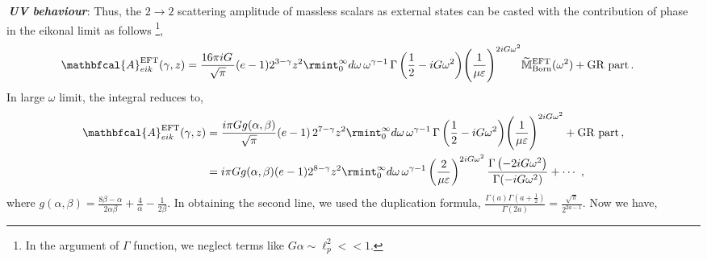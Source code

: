 \noindent
{\textit{\textbf{\,{UV behaviour}}}}:
Thus, the $2\rightarrow2$ scattering amplitude of massless scalars as external states can be casted with the contribution of phase in the eikonal limit as follows \footnote{In the argument of $\Gamma$ function, we neglect terms like $G\alpha\sim \ell_p^2<<1$.}, 
\begin{align}
    \begin{split}\label{3.32a}
    \mathbfcal{A}^{\textrm{EFT}}_{eik}(\gamma,z)&=\frac{16\pi i G \,}{\sqrt{\pi}}(e-1)2^{3-\gamma}z^2\rmint_0^\infty d\omega \,\omega^{\gamma-1}\,{\Gamma\left(\frac{1}{2}-iG \omega^2\right)}\Bigg(\frac{1}{\mu \varepsilon}\Bigg)^{2iG\omega^2}\widetilde{\mathbb{M}}^{\textrm{EFT}}_{\textrm{Born}}(\omega^2)+\textrm{GR part}\,.
    \end{split}
\end{align}
In large $\omega$ limit, the integral reduces to,
\begin{align}
\begin{split}\label{3.27k}
\mathbfcal{A}^{\textrm{EFT}}_{eik}(\gamma,z)&= \frac{i\pi  G g(\alpha,\beta)}{\sqrt{\pi}}(e-1)\,2^{7-\gamma}z^2\rmint_0^\infty d\omega \,\omega^{\gamma-1}\,{\Gamma\left(\frac{1}{2}-iG \omega^2\right)}\Bigg(\frac{1}{\mu \varepsilon}\Bigg)^{2iG\omega^2}+\textrm{GR part}\,,\\ &
        =i\pi G g(\alpha,\beta)(e-1)2^{8-\gamma}z^2 \rmint_{0}^{\infty} d\omega\,\omega^{\gamma-1}\left(\frac{2}{\mu\varepsilon}\right)^{2iG\omega^2}\frac{\Gamma\left(-2iG\omega^2\right)}{\Gamma(-iG\omega^2)}+\cdots\,\,,
    \end{split}
\end{align}where $  g(\alpha,\beta)=\frac{8\beta-\alpha}{2\alpha\beta}+\frac{4}{\alpha}-\frac{1}{2\beta}.$ In obtaining the second line, we used the duplication formula,
$\frac{\Gamma(a)\Gamma(a+\frac{1}{2})}{\Gamma(2a)}= \frac{\sqrt{\pi}}{2^{2a-1}}.$ Now we have,
